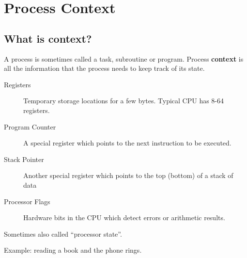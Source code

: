 %
%
%
%
%
%
% 
%
%

\section{Process Context}
\subsection{What is context?}
A process is sometimes called a task, subroutine or
program.  Process {\bf context} is all the information that
the process needs to keep track of its state.

\begin{description}
\item[Registers]   Temporary storage locations for a few
bytes.  Typical CPU has 8-64 registers.
\item[Program Counter] A special register which points to the
next instruction to be executed.
\item[Stack Pointer] Another special register which points to
the top (bottom) of a stack of data
\item[Processor Flags] Hardware bits in the CPU which detect
errors or arithmetic results.
\end{description}

Sometimes also called ``processor state''.

Example:  reading a book and the phone rings.


